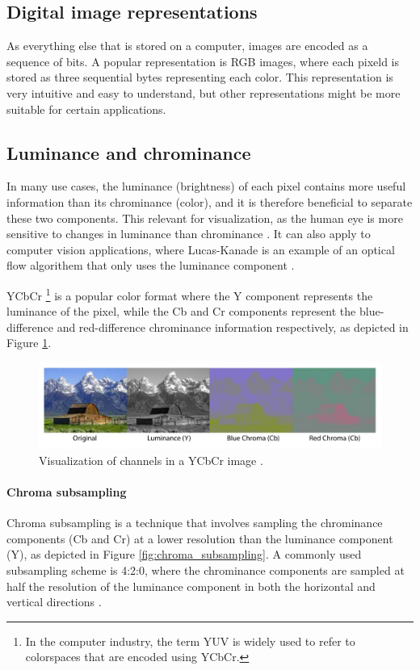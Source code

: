 \subsection{Digital image representations}
As everything else that is stored on a computer, images are encoded as a sequence of bits.
A popular representation is RGB images, where each pixeld is stored as three sequential bytes representing each color.
This representation is very intuitive and easy to understand, but other representations might be more suitable for certain applications.

\subsection{Luminance and chrominance}
In many use cases, the luminance (brightness) of each pixel contains more useful information than its chrominance (color), and it is therefore beneficial to separate these two components.
This relevant for visualization, as the human eye is more sensitive to changes in luminance than chrominance  \cite{lambWhyRodsCones2016}.
It can also apply to computer vision applications, where Lucas-Kanade is an example of an optical flow algorithem that only uses the luminance component \cite{lucasIterativeImageRegistration1981}.

YCbCr
\footnote{In the computer industry, the term YUV is widely used to refer to colorspaces that are encoded using YCbCr.}
is a popular color format where the Y component represents the luminance of the pixel, while the Cb and Cr components represent the blue-difference and red-difference chrominance information respectively, as depicted in Figure \ref{fig:ycbcr_example}.

\begin{figure}[H]
    \centering
    \includegraphics[width=\textwidth]{figures/debayer/YCbCr_example.pdf}
    \caption{Visualization of channels in a YCbCr image \cite{photoEnglishJohnMoulton2004}.}
    \label{fig:ycbcr_example}
\end{figure}

\paragraph{Chroma subsampling}
Chroma subsampling is a technique that involves sampling the chrominance components (Cb and Cr) at a lower resolution than the luminance component (Y), as depicted in Figure \ref{fig:chroma_subsampling}.
A commonly used subsampling scheme is 4:2:0, where the chrominance components are sampled at half the resolution of the luminance component in both the horizontal and vertical directions \cite{ChromaSubsampling2023}.

